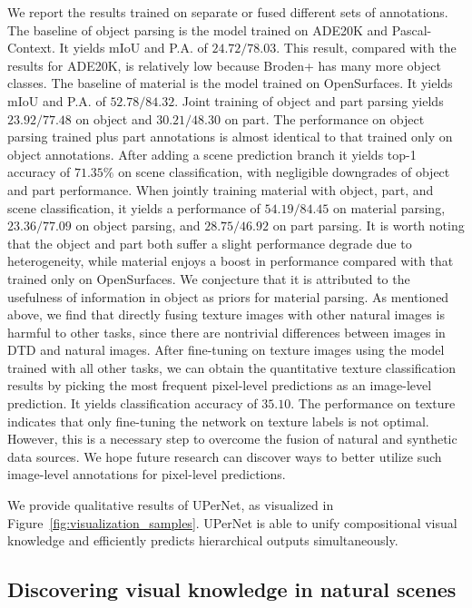 \documentclass[runningheads]{llncs}
\begin{document}
 We report the results trained on separate or fused different sets of annotations. The baseline of object parsing is the model trained on ADE20K and Pascal-Context. It yields mIoU and P.A. of $24.72/78.03$. This result, compared with the results for ADE20K, is relatively low because Broden+ has many more object classes. The baseline of material is the model trained on OpenSurfaces. It yields mIoU and P.A. of $52.78/84.32$. Joint training of object and part parsing yields $23.92/77.48$ on object and $30.21/48.30$ on part. The performance on object parsing trained plus part annotations is almost identical to that trained only on object annotations. After adding a scene prediction branch it yields top-1 accuracy of $71.35\%$ on scene classification, with negligible downgrades of object and part performance. When jointly training material with object, part, and scene classification, it yields a performance of $54.19/84.45$ on material parsing, $23.36/77.09$ on object parsing, and $28.75/46.92$ on part parsing. It is worth noting that the object and part both suffer a slight performance degrade due to heterogeneity, while material enjoys a boost in performance compared with that trained only on OpenSurfaces. We conjecture that it is attributed to the usefulness of information in object as priors for material parsing. As mentioned above, we find that directly fusing texture images with other natural images is harmful to other tasks, since there are nontrivial differences between images in DTD and natural images. After fine-tuning on texture images using the model trained with all other tasks, we can obtain the quantitative texture classification results by picking the most frequent pixel-level predictions as an image-level prediction. It yields classification accuracy of $35.10$. The performance on texture indicates that only fine-tuning the network on texture labels is not optimal. However, this is a necessary step to overcome the fusion of natural and synthetic data sources. We hope future research can discover ways to better utilize such image-level annotations for pixel-level predictions.

 We provide qualitative results of UPerNet, as visualized in Figure~\ref{fig:visualization_samples}. UPerNet is able to unify compositional visual knowledge and efficiently predicts hierarchical outputs simultaneously.

\subsection{Discovering visual knowledge in natural scenes}
\label{sec:visual_knowledge}
\end{document}
